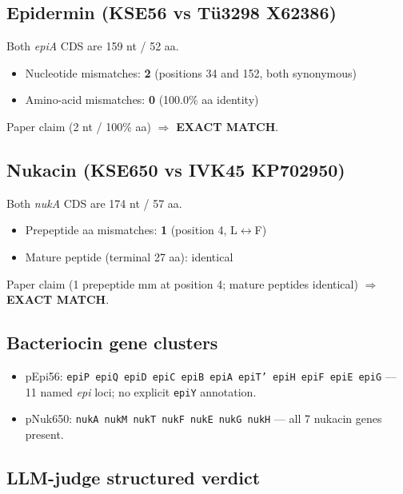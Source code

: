 \documentclass[11pt,letterpaper]{article}
\begin{document}
\subsection{Epidermin (KSE56 vs T\"u3298 X62386)}

Both \textit{epiA} CDS are 159 nt / 52 aa.

\begin{itemize}
  \item Nucleotide mismatches: \textbf{2} (positions 34 and 152, both synonymous)
  \item Amino-acid mismatches: \textbf{0} (100.0\% aa identity)
\end{itemize}

Paper claim (2 nt / 100\% aa) $\Rightarrow$ \textbf{EXACT MATCH}.

\subsection{Nukacin (KSE650 vs IVK45 KP702950)}

Both \textit{nukA} CDS are 174 nt / 57 aa.

\begin{itemize}
  \item Prepeptide aa mismatches: \textbf{1} (position 4, L$\leftrightarrow$F)
  \item Mature peptide (terminal 27 aa): identical
\end{itemize}

Paper claim (1 prepeptide mm at position 4; mature peptides identical) $\Rightarrow$ \textbf{EXACT MATCH}.

\subsection{Bacteriocin gene clusters}

\begin{itemize}
  \item pEpi56: \texttt{epiP epiQ epiD epiC epiB epiA epiT' epiH epiF epiE epiG} --- 11 named \textit{epi} loci; no explicit \texttt{epiY} annotation.
  \item pNuk650: \texttt{nukA nukM nukT nukF nukE nukG nukH} --- all 7 nukacin genes present.
\end{itemize}

\subsection{LLM-judge structured verdict}
\end{document}
